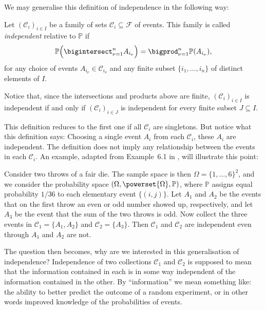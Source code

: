 \documentclass[article, a4paper, 11pt, oneside]{memoir}
\numberwithin{equation}{chapter}
\newcommand{\calF}{\mathcal{F}}
\newcommand{\calC}{\mathcal{C}}
\renewcommand{\P}{\mathbb{P}}
\begin{document}
We may generalise this definition of independence in the following way:

\begin{definition}[Independence II]
    \label{def:independence-2}
    Let $(\calC_i)_{i \in I}$ be a family of sets $\calC_i \subseteq \calF$ of events. This family is called \emph{independent} relative to $\P$ if
    \begin{equation*}
        \P \Bigl( \bigintersect_{\nu = 1}^n A_{i_\nu} \Bigr)
            = \bigprod_{\nu = 1}^n \P(A_{i_\nu}),
    \end{equation*}
    for any choice of events $A_{i_\nu} \in \calC_{i_\nu}$ and any finite subset $\{ i_1, \ldots, i_n \}$ of distinct elements of $I$.
\end{definition}

\begin{remark}
    \label{rem:finite-subfamilies-independent}
    Notice that, since the intersections and products above are finite, $(\calC_i)_{i \in I}$ is independent if and only if $(\calC_i)_{i \in J}$ is independent for every finite subset $J \subseteq I$.
\end{remark}
%
This definition reduces to the first one if all $\calC_i$ are singletons. But notice what this definition says: Choosing a single event $A_i$ from each $\calC_i$, these $A_i$ are independent. The definition does not imply any relationship between the events in each $\calC_i$. An example, adapted from Example~6.1 in \textcite{bauer1995}, will illustrate this point:


\begin{example}
    \label{ex:die-throw-1}
    Consider two throws of a fair die. The sample space is then $\Omega = \{1, \ldots, 6\}^2$, and we consider the probability space $(\Omega, \powerset{\Omega}, \P)$, where $\P$ assigns equal probability $1/36$ to each elementary event $\{(i,j)\}$. Let $A_1$ and $A_2$ be the events that on the first throw an even or odd number showed up, respectively, and let $A_3$ be the event that the sum of the two throws is odd. Now collect the three events in $\calC_1 = \{A_1, A_2\}$ and $\calC_2 = \{A_3\}$. Then $\calC_1$ and $\calC_2$ are independent even through $A_1$ and $A_2$ are not.
\end{example}
%
The question then becomes, why are we interested in this generalisation of independence? Independence of two collections $\calC_1$ and $\calC_2$ is supposed to mean that the information contained in each is in some way independent of the information contained in the other. By \enquote{information} we mean something like: the ability to better predict the outcome of a random experiment, or in other words improved knowledge of the probabilities of events.
\end{document}
